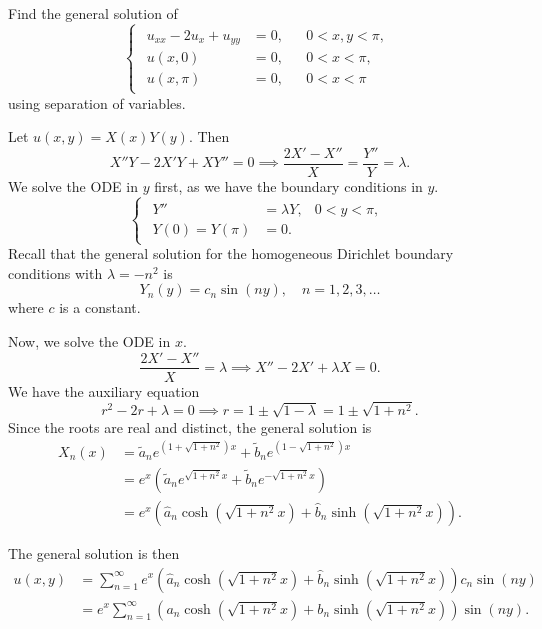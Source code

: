 \documentclass[plain]{pset}
\begin{document}
\pagebreak

\begin{problem}
Find the general solution of
\[
    \begin{cases}
        \begin{aligned}
            u_{xx} - 2u_x + u_{yy} & = 0, &  & 0 < x, y < \pi, \\
            u(x, 0)                & = 0, &  & 0 < x < \pi,    \\
            u(x, \pi)              & = 0, &  & 0 < x < \pi
        \end{aligned}
    \end{cases}
\]
using separation of variables.
\end{problem}
\begin{solution}
    Let \(u(x, y) = X(x)Y(y)\). Then
    \[X''Y - 2X'Y + XY'' = 0 \implies \frac{2X' - X''}{X} = \frac{Y''}{Y} = \lambda.\]
    We solve the ODE in \(y\) first, as we have the boundary conditions in \(y\).
    \[
        \begin{cases}
            \begin{aligned}
                Y''           & = \lambda Y, & 0 < y < \pi, \\
                Y(0) = Y(\pi) & = 0.
            \end{aligned}
        \end{cases}
    \]
    Recall that the general solution for the homogeneous Dirichlet boundary conditions with \(\lambda = -n^2\) is
    \[Y_n(y) = c_n \sin(ny), \quad n = 1, 2, 3, \ldots\]
    where \(c\) is a constant.

    Now, we solve the ODE in \(x\).
    \[\frac{2X' - X''}{X} = \lambda \implies X'' - 2X' + \lambda X = 0.\]
    We have the auxiliary equation
    \[r^2 - 2r + \lambda = 0 \implies r = 1 \pm \sqrt{1 - \lambda} = 1 \pm \sqrt{1 + n^2}.\]
    Since the roots are real and distinct, the general solution is
    \begin{align*}
        X_n(x) & = \tilde{a}_n e^{(1 + \sqrt{1 + n^2})x} + \tilde{b}_n e^{(1 - \sqrt{1 + n^2})x}                              \\
               & = e^x\left(\tilde{a}_n e^{\sqrt{1 + n^2}x} + \tilde{b}_n e^{-\sqrt{1 + n^2}x}\right)                         \\
               & = e^x\left(\hat{a}_n \cosh\left(\sqrt{1 + n^2}x\right) + \hat{b}_n \sinh\left(\sqrt{1 + n^2}x\right)\right).
    \end{align*}

    The general solution is then
    \begin{align*}
        u(x, y) & = \sum_{n = 1}^\infty e^x\left(\hat{a}_n \cosh\left(\sqrt{1 + n^2}x\right) + \hat{b}_n \sinh\left(\sqrt{1 + n^2}x\right)\right) c_n\sin(ny) \\
                & = e^x \sum_{n = 1}^\infty \left(a_n \cosh\left(\sqrt{1 + n^2}x\right) + b_n \sinh\left(\sqrt{1 + n^2}x\right)\right) \sin(ny).
    \end{align*}
\end{solution}
\end{document}
